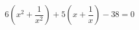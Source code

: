 \begin{ex}[type=equation]
	\begin{condition}
		\( 6\left( x^2+\dfrac{1}{x^2} \right)+5\left( x+\dfrac{1}{x} \right)-38=0 \)
	\end{condition}
\end{ex}